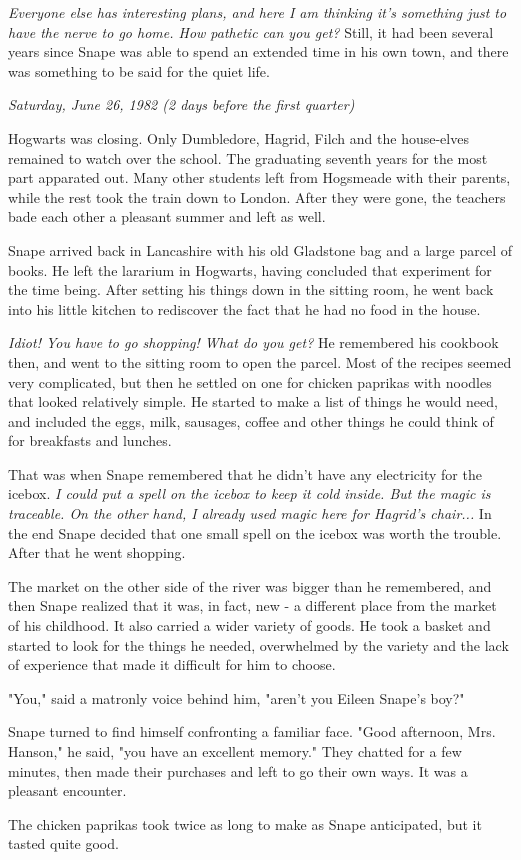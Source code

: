 \documentclass[a4paper,11pt]{article}
\begin{document}
\emph{Everyone else has interesting plans, and here I am thinking it's something just to have the nerve to go home. How pathetic can you get?} Still, it had been several years since Snape was able to spend an extended time in his own town, and there was something to be said for the quiet life.

\emph{Saturday, June 26, 1982 (2 days before the first quarter)}

Hogwarts was closing. Only Dumbledore, Hagrid, Filch and the house-elves remained to watch over the school. The graduating seventh years for the most part apparated out. Many other students left from Hogsmeade with their parents, while the rest took the train down to London. After they were gone, the teachers bade each other a pleasant summer and left as well.

Snape arrived back in Lancashire with his old Gladstone bag and a large parcel of books. He left the lararium in Hogwarts, having concluded that experiment for the time being. After setting his things down in the sitting room, he went back into his little kitchen to rediscover the fact that he had no food in the house.

\emph{Idiot! You have to go shopping! What do you get?} He remembered his cookbook then, and went to the sitting room to open the parcel. Most of the recipes seemed very complicated, but then he settled on one for chicken paprikas with noodles that looked relatively simple. He started to make a list of things he would need, and included the eggs, milk, sausages, coffee and other things he could think of for breakfasts and lunches.

That was when Snape remembered that he didn't have any electricity for the icebox. \emph{I could put a spell on the icebox to keep it cold inside. But the magic is traceable. On the other hand, I already used magic here for Hagrid's chair...} In the end Snape decided that one small spell on the icebox was worth the trouble. After that he went shopping.

The market on the other side of the river was bigger than he remembered, and then Snape realized that it was, in fact, new - a different place from the market of his childhood. It also carried a wider variety of goods. He took a basket and started to look for the things he needed, overwhelmed by the variety and the lack of experience that made it difficult for him to choose.

"You," said a matronly voice behind him, "aren't you Eileen Snape's boy?"

Snape turned to find himself confronting a familiar face. "Good afternoon, Mrs. Hanson," he said, "you have an excellent memory." They chatted for a few minutes, then made their purchases and left to go their own ways. It was a pleasant encounter.

The chicken paprikas took twice as long to make as Snape anticipated, but it tasted quite good.
\end{document}
